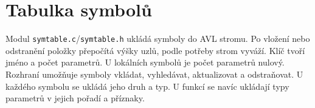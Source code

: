 \section{Tabulka symbolů}
\label{sec:symtable}

Modul \texttt{symtable.c}/\texttt{symtable.h} ukládá symboly do AVL stromu. Po vložení nebo odstranění položky přepočítá výšky uzlů, podle potřeby strom vyváží. Klíč tvoří jméno a počet parametrů. U lokálních symbolů je počet parametrů nulový. Rozhraní umožňuje symboly vkládat, vyhledávat, aktualizovat a odstraňovat. U každého symbolu se ukládá jeho druh a typ. U funkcí se navíc ukládají typy parametrů v jejich pořadí a příznaky.